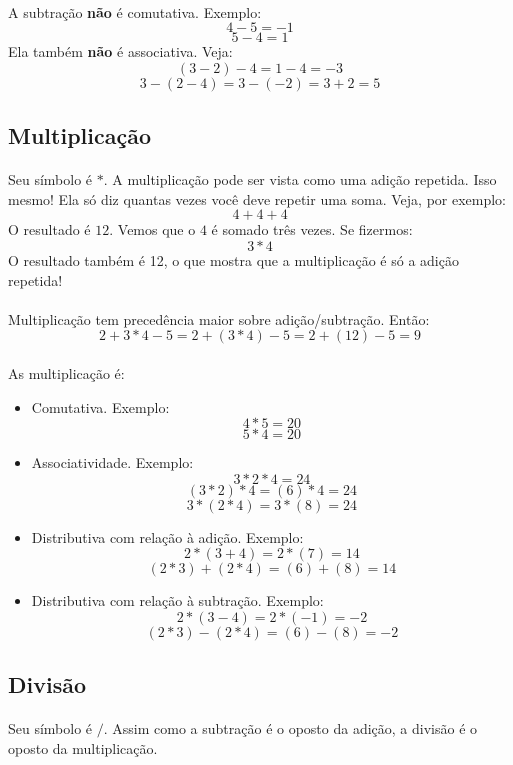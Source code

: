 \documentclass[12pt]{article}
\begin{document}
\paragraph{}
A subtração \textbf{não} é comutativa. Exemplo:
$$4 - 5 = -1$$
$$5 - 4 = 1$$
Ela também \textbf{não} é associativa. Veja:
$$(3 - 2) - 4 = 1 - 4 = -3$$
$$3 - (2 - 4) = 3 - (-2) = 3 + 2 = 5$$

\subsection{Multiplicação}
\paragraph{}
Seu símbolo é $*$.
A multiplicação pode ser vista como uma adição repetida. Isso mesmo! Ela só
diz quantas vezes você deve repetir uma soma. Veja, por exemplo:
$$4 + 4 + 4$$
O resultado é $12$. Vemos que o $4$ é somado três vezes. Se fizermos:
$$3*4$$
O resultado também é 12, o que mostra que a multiplicação é só a adição 
repetida!
\paragraph{}
Multiplicação tem precedência maior sobre adição/subtração. Então:
$$2 + 3*4 - 5 = 2 + (3*4) - 5 = 2 + (12) - 5 = 9$$
\paragraph{}
As multiplicação é:
\begin{itemize}
\item Comutativa. Exemplo:
$$4*5 = 20$$
$$5*4 = 20$$
\item Associatividade. Exemplo:
$$3*2*4 = 24$$
$$(3*2)*4 = (6)*4 = 24$$
$$3*(2*4) = 3*(8) = 24$$
\item Distributiva com relação à adição. Exemplo:
$$2*(3 + 4) = 2*(7) = 14$$
$$(2*3) + (2*4) = (6) + (8) = 14$$
\item Distributiva com relação à subtração. Exemplo:
$$2*(3 - 4) = 2*(-1) = -2$$
$$(2*3) - (2*4) = (6) - (8) = -2$$
\end{itemize}

\subsection{Divisão}
\paragraph{}
Seu símbolo é $/$.
Assim como a subtração é o oposto da adição, a divisão é o oposto da 
multiplicação.
\end{document}
